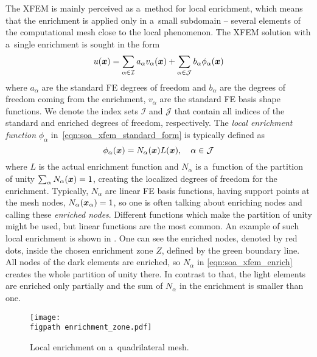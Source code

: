 The XFEM is mainly perceived as a~method for local enrichment, which means that the enrichment is applied only
in a~small subdomain -- several elements of the computational mesh close to the local phenomenon.
The XFEM solution with a~single enrichment is sought in the form
\begin{equation} \label{eqn:soa_xfem_standard_form}
  u(\mathbf{\boldsymbol{x}}) = \sum_{\alpha\in\mathcal{I}}a_\alpha v_\alpha(\mathbf{\boldsymbol{x}})
    + \sum_{\alpha\in\mathcal{J}} b_{\alpha} \phi_{\alpha}(\mathbf{\boldsymbol{x}})
\end{equation}
where $a_\alpha$ are the standard FE degrees of freedom and $b_{\alpha}$ are the degrees of freedom coming from
the enrichment, $v_\alpha$ are the standard FE basis shape functions. We denote the index sets $\mathcal{I}$ and
$\mathcal{J}$ that contain all indices of the standard and enriched degrees of freedom, respectively.
The \emph{local enrichment function} $\phi_{\alpha}$ in~\eqref{eqn:soa_xfem_standard_form} is typically defined as
\begin{equation} \label{eqn:soa_xfem_enrich}
    \phi_{\alpha}(\mathbf{\boldsymbol{x}}) = N_\alpha(\mathbf{\boldsymbol{x}})L(\mathbf{\boldsymbol{x}}), \quad \alpha\in\mathcal{J}
\end{equation}
where $L$ is the actual enrichment function and $N_\alpha$ is a~function of the partition of unity
$\sum_\alpha N_\alpha(\mathbf{\boldsymbol{x}}) = 1$, creating the localized degrees of freedom for the enrichment.
Typically, $N_\alpha$ are linear FE basis functions, having support points at the mesh nodes, $N_\alpha(\mathbf{\boldsymbol{x}}_\alpha)=1$,
so one is often talking about enriching nodes and calling these \emph{enriched nodes}.
Different functions which make the partition of unity might be used, but linear functions are the most common.
An example of such local enrichment is shown in . One can see the enriched nodes, denoted
by red dots, inside the chosen enrichment zone $Z$, defined by the green boundary line. All nodes of the dark elements
are enriched, so $N_\alpha$ in \eqref{eqn:soa_xfem_enrich} creates the whole partition of unity there. In contrast to that, 
the light elements are enriched only partially and the sum of $N_\alpha$ in the enrichment is smaller than one.

\begin{figure}[!htb]
  \centering    
    \texttt{[image: \\figpath enrichment\_zone.pdf]}
  \caption[Local enrichment]{Local enrichment on a~quadrilateral mesh. }
  \label{fig:enrichment_zone}
\end{figure}
%     

